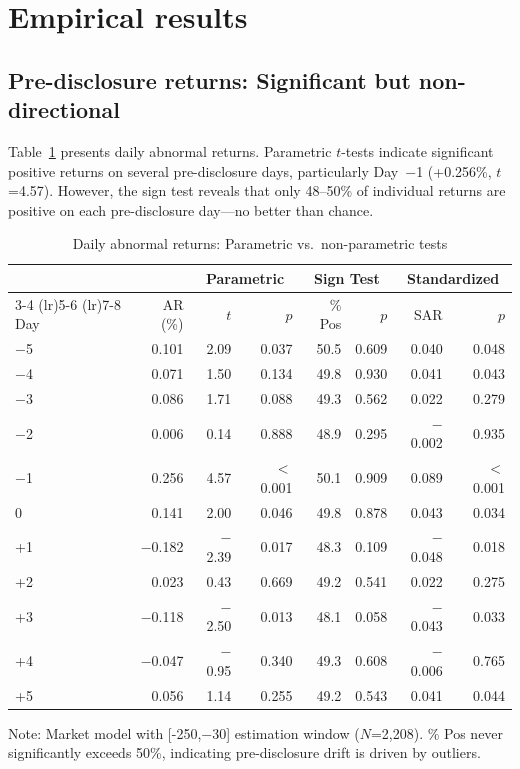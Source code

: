 \documentclass[review,authoryear]{elsarticle}
\begin{document}
\section{Empirical results}
\label{sec:results}

\subsection{Pre-disclosure returns: Significant but non-directional}

Table~\ref{tab:ar} presents daily abnormal returns. Parametric $t$-tests indicate significant positive returns on several pre-disclosure days, particularly Day~$-$1 (+0.256\%, $t$=4.57). However, the sign test reveals that only 48--50\% of individual returns are positive on each pre-disclosure day---no better than chance.

\begin{table}[ht]
\caption{Daily abnormal returns: Parametric vs.\ non-parametric tests}
\label{tab:ar}
\begin{tabular}{lrrrrrrr}
\toprule
& & \multicolumn{2}{c}{Parametric} & \multicolumn{2}{c}{Sign Test} & \multicolumn{2}{c}{Standardized} \\
\cmidrule(lr){3-4} \cmidrule(lr){5-6} \cmidrule(lr){7-8}
Day & AR (\%) & $t$ & $p$ & \% Pos & $p$ & SAR & $p$ \\
\midrule
$-$5 & 0.101 & 2.09 & 0.037 & 50.5 & 0.609 & 0.040 & 0.048 \\
$-$4 & 0.071 & 1.50 & 0.134 & 49.8 & 0.930 & 0.041 & 0.043 \\
$-$3 & 0.086 & 1.71 & 0.088 & 49.3 & 0.562 & 0.022 & 0.279 \\
$-$2 & 0.006 & 0.14 & 0.888 & 48.9 & 0.295 & $-$0.002 & 0.935 \\
$-$1 & 0.256 & 4.57 & $<$0.001 & 50.1 & 0.909 & 0.089 & $<$0.001 \\
\midrule
0 & 0.141 & 2.00 & 0.046 & 49.8 & 0.878 & 0.043 & 0.034 \\
+1 & $-$0.182 & $-$2.39 & 0.017 & 48.3 & 0.109 & $-$0.048 & 0.018 \\
\midrule
+2 & 0.023 & 0.43 & 0.669 & 49.2 & 0.541 & 0.022 & 0.275 \\
+3 & $-$0.118 & $-$2.50 & 0.013 & 48.1 & 0.058 & $-$0.043 & 0.033 \\
+4 & $-$0.047 & $-$0.95 & 0.340 & 49.3 & 0.608 & $-$0.006 & 0.765 \\
+5 & 0.056 & 1.14 & 0.255 & 49.2 & 0.543 & 0.041 & 0.044 \\
\bottomrule
\end{tabular}
\begin{flushleft}
\small Note: Market model with [-250,$-$30] estimation window ($N$=2,208). \% Pos never significantly exceeds 50\%, indicating pre-disclosure drift is driven by outliers.
\end{flushleft}
\end{table}
\end{document}
